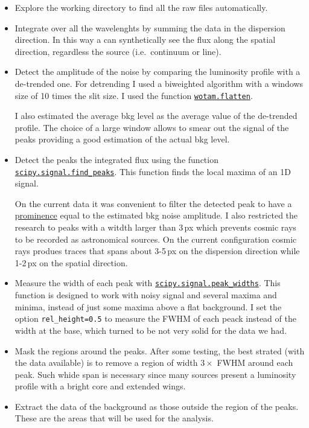 \documentclass{article}
\begin{document}
\begin{itemize}
	\item Explore the working directory to find all the raw files automatically.
	
	\item Integrate over all the wavelenghts by summing the data in the dispersion direction. In this way a can synthetically see the flux along the spatial direction, regardless the source (i.e.\ continuum or line).
	
	\item Detect the amplitude of the noise by comparing the luminosity profile with a de-trended one. For detrending I used a biweighted algorithm with a windows size of 10 times the slit size. I used the function \href{https://github.com/hippke/wotan}{\texttt{wotam.flatten}}.
	
	I also estimated the average bkg level as the average value of the de-trended profile. The choice of a large window allows to smear out the signal of the peaks providing a good estimation of the actual bkg level.
	
	\item Detect the peaks the integrated flux using the function \href{https://docs.scipy.org/doc/scipy/reference/generated/scipy.signal.find_peaks.html}{\texttt{scipy.signal.find\_peaks}}. This function finds the local maxima of an 1D signal.
	
		
	On the current data it was convenient to filter the detected peak to have a \href{https://en.wikipedia.org/wiki/Topographic_prominence}{prominence} equal to the estimated bkg noise amplitude. I also restricted the research to peaks with a witdth larger than 3\,px which prevents cosmic rays to be recorded as astronomical sources. On the current configuration cosmic rays produes traces that spans about 3-5\,px on the dispersion direction while 1-2\,px on the spatial direction.
	
	\item Measure the width of each peak with \href{https://docs.scipy.org/doc/scipy/reference/generated/scipy.signal.peak_widths.html#scipy.signal.peak_widths}{\texttt{scipy.signal.peak\_widths}}. This function is designed to work with noisy signal and several maxima and minima, instead of just some maxima above a flat background. I set the option \texttt{rel\_height=0.5} to measure the FWHM of each peack instead of the width at the base, which turned to be not very solid for the data we had.
	
	\item Mask the regions around the peaks. After some testing, the best strated (with the data available) is to remove a region of width $ 3\times$ FWHM around each peak. Such whide span is necessary since many sources present a luminosity profile with a bright core and extended wings.
	
	
	\item Extract the data of the background as those outside the region of the peaks. These are the areas that will be used for the analysis.
\end{itemize}
\end{document}
